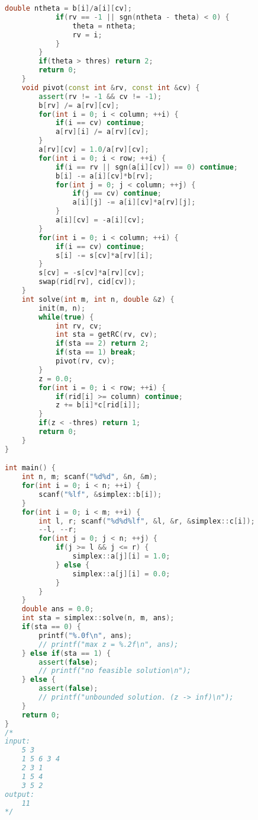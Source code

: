 \begin{lstlisting}[language=C++]
            double ntheta = b[i]/a[i][cv];
            if(rv == -1 || sgn(ntheta - theta) < 0) {
                theta = ntheta;
                rv = i;
            }
        }
        if(theta > thres) return 2;
        return 0;
    }
    void pivot(const int &rv, const int &cv) {
        assert(rv != -1 && cv != -1);
        b[rv] /= a[rv][cv];
        for(int i = 0; i < column; ++i) {
            if(i == cv) continue;
            a[rv][i] /= a[rv][cv];
        }
        a[rv][cv] = 1.0/a[rv][cv];
        for(int i = 0; i < row; ++i) {
            if(i == rv || sgn(a[i][cv]) == 0) continue;
            b[i] -= a[i][cv]*b[rv];
            for(int j = 0; j < column; ++j) {
                if(j == cv) continue;
                a[i][j] -= a[i][cv]*a[rv][j];
            }
            a[i][cv] = -a[i][cv];
        }
        for(int i = 0; i < column; ++i) {
            if(i == cv) continue;
            s[i] -= s[cv]*a[rv][i];
        }
        s[cv] = -s[cv]*a[rv][cv];
        swap(rid[rv], cid[cv]);
    }
    int solve(int m, int n, double &z) {
        init(m, n);
        while(true) {
            int rv, cv;
            int sta = getRC(rv, cv);
            if(sta == 2) return 2;
            if(sta == 1) break;
            pivot(rv, cv);
        }
        z = 0.0;
        for(int i = 0; i < row; ++i) {
            if(rid[i] >= column) continue;
            z += b[i]*c[rid[i]];
        }
        if(z < -thres) return 1;
        return 0;
    }
}

int main() {
    int n, m; scanf("%d%d", &n, &m);
    for(int i = 0; i < n; ++i) {
        scanf("%lf", &simplex::b[i]);
    }
    for(int i = 0; i < m; ++i) {
        int l, r; scanf("%d%d%lf", &l, &r, &simplex::c[i]);
        --l, --r;
        for(int j = 0; j < n; ++j) {
            if(j >= l && j <= r) {
                simplex::a[j][i] = 1.0;
            } else {
                simplex::a[j][i] = 0.0;
            }
        }
    }
    double ans = 0.0;
    int sta = simplex::solve(n, m, ans);
    if(sta == 0) {
        printf("%.0f\n", ans);
        // printf("max z = %.2f\n", ans);
    } else if(sta == 1) {
        assert(false);
        // printf("no feasible solution\n");
    } else {
        assert(false);
        // printf("unbounded solution. (z -> inf)\n");
    }
    return 0;
}
/*
input:
    5 3
    1 5 6 3 4
    2 3 1
    1 5 4
    3 5 2
output:
    11
*/
\end{lstlisting}
